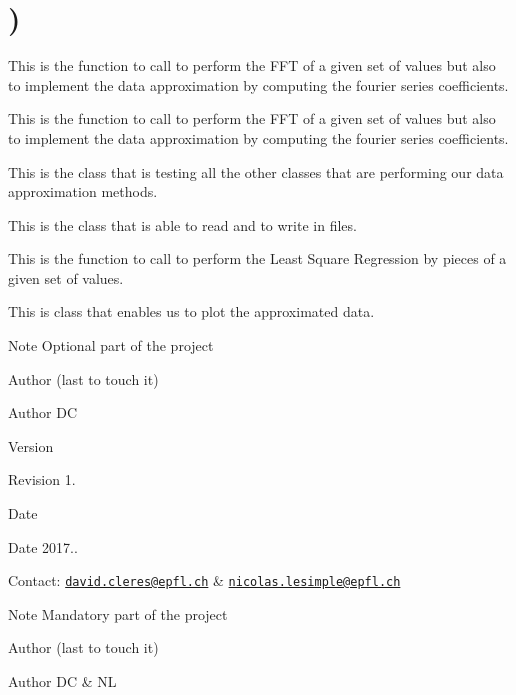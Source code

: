 \hypertarget{group__somewhere}{}\section{)}
\label{group__somewhere}


This is the function to call to perform the F\+FT of a given set of values but also to implement the data approximation by computing the fourier series coefficients.  


This is the function to call to perform the F\+FT of a given set of values but also to implement the data approximation by computing the fourier series coefficients. 

This is the class that is testing all the other classes that are performing our data approximation methods.

This is the class that is able to read and to write in files.

This is the function to call to perform the Least Square Regression by pieces of a given set of values.

This is class that enables us to plot the approximated data.

\begin{DoxyNote}{Note}
Optional part of the project
\end{DoxyNote}
\begin{DoxyAuthor}{Author}
(last to touch it) 
\end{DoxyAuthor}
\begin{DoxyParagraph}{Author}
DC 
\end{DoxyParagraph}


\begin{DoxyVersion}{Version}

\end{DoxyVersion}
\begin{DoxyParagraph}{Revision}
1. 
\end{DoxyParagraph}


\begin{DoxyDate}{Date}

\end{DoxyDate}
\begin{DoxyParagraph}{Date}
2017.. 
\end{DoxyParagraph}


Contact\+: \href{mailto:david.cleres@epfl.ch}{\tt david.\+cleres@epfl.\+ch} \& \href{mailto:nicolas.lesimple@epfl.ch}{\tt nicolas.\+lesimple@epfl.\+ch}

\begin{DoxyNote}{Note}
Mandatory part of the project
\end{DoxyNote}
\begin{DoxyAuthor}{Author}
(last to touch it) 
\end{DoxyAuthor}
\begin{DoxyParagraph}{Author}
DC \& NL
\end{DoxyParagraph}



